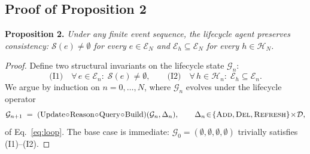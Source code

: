 \documentclass{article}
\begin{document}
\subsection{Proof of Proposition 2}\label{proof2}
\textbf{Proposition 2.} \textit{Under any finite event sequence, the lifecycle agent preserves consistency: $\mathcal{S}(e)\!\neq\!\emptyset$ for every $e\!\in\!\mathcal{E}_N$ and $\mathcal{E}_h\!\subseteq\!\mathcal{E}_N$ for every $h\!\in\!\mathcal{H}_N$.}\vspace{-2mm}
\begin{proof}
Define two structural invariants on the lifecycle state $\mathcal{G}_n$:
\begin{equation}
\text{(I1)}\quad\forall\,e\!\in\!\mathcal{E}_n\!:\;\mathcal{S}(e)\!\neq\!\emptyset,\qquad
\text{(I2)}\quad\forall\,h\!\in\!\mathcal{H}_n\!:\;\mathcal{E}_h\!\subseteq\!\mathcal{E}_n.
\label{eq:p2-inv}
\end{equation}
We argue by induction on $n\!=\!0,\dots,N$, where $\mathcal{G}_n$ evolves under the lifecycle operator
\begin{equation}
\mathcal{G}_{n+1}\;=\;(\mathrm{Update}\!\circ\!\mathrm{Reason}\!\circ\!\mathrm{Query}\!\circ\!\mathrm{Build})(\mathcal{G}_n,\Delta_n),\qquad \Delta_n\!\in\!\{\textsc{Add},\textsc{Del},\textsc{Refresh}\}\!\times\!\mathcal{D},
\label{eq:p2-loop}
\end{equation}
of Eq.~\eqref{eq:loop}. The base case is immediate: $\mathcal{G}_0\!=\!(\emptyset,\emptyset,\emptyset,\emptyset)$ trivially satisfies (I1)--(I2).


\end{proof}
\end{document}
